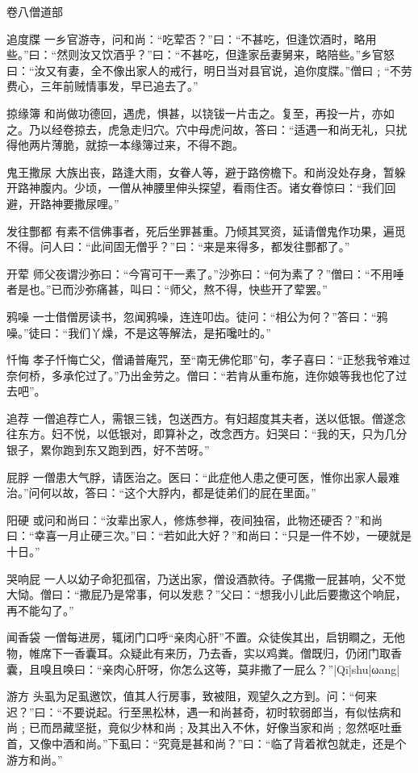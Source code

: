 \documentclass[12pt,UTF8]{ctexbook}
\begin{document}
卷八僧道部

追度牒
一乡官游寺，问和尚：“吃荤否？”曰：“不甚吃，但逢饮酒时，略用些。”曰：“然则汝又饮酒乎？”曰：“不甚吃，但逢家岳妻舅来，略陪些。”乡官怒曰：“汝又有妻，全不像出家人的戒行，明日当对县官说，追你度牒。”僧曰﹔“不劳费心，三年前贼情事发，早已追去了。”

掠缘簿
和尚做功德回，遇虎，惧甚，以铙钹一片击之。复至，再投一片，亦如之。乃以经卷掠去，虎急走归穴。穴中母虎问故，答曰：“适遇一和尚无礼，只扰得他两片薄脆，就掠一本缘簿过来，不得不跑。

鬼王撒尿
大族出丧，路逢大雨，女眷人等，避于路傍檐下。和尚没处存身，暂躲开路神腹内。少顷，一僧从神腰里伸头探望，看雨住否。诸女眷惊曰：“我们回避，开路神要撒尿哩。”

发往酆都
有素不信佛事者，死后坐罪甚重。乃倾其冥资，延请僧鬼作功果，遍觅不得。问人曰：“此间固无僧乎？”曰：“来是来得多，都发往酆都了。”

开荤
师父夜谓沙弥曰：“今宵可干一素了。”沙弥曰：“何为素了？”僧曰：“不用唾者是也。”已而沙弥痛甚，叫曰：“师父，熬不得，快些开了荤罢。”

鸦噪
一士借僧房读书，忽闻鸦噪，连连叩齿。徒问：“相公为何？”答曰：“鸦噪。”徒曰：“我们丫燥，不是这等解法，是拓嚵吐的。”

忏悔
孝子忏悔亡父，僧诵普庵咒，至“南无佛佗耶”句，孝子喜曰：“正愁我爷难过奈何桥，多承佗过了。”乃出金劳之。僧曰：“若肯从重布施，连你娘等我也佗了过去吧”。

追荐
一僧追荐亡人，需银三钱，包送西方。有妇超度其夫者，送以低银。僧遂念往东方。妇不悦，以低银对，即算补之，改念西方。妇哭曰：“我的天，只为几分银子，累你跑到东又跑到西，好不苦呀。”

屁脬
一僧患大气脬，请医治之。医曰：“此症他人患之便可医，惟你出家人最难治。”问何以故，答曰：“这个大脬内，都是徒弟们的屁在里面。”

阳硬
或问和尚曰：“汝辈出家人，修炼参禅，夜间独宿，此物还硬否？”和尚曰：“幸喜一月止硬三次。”曰：“若如此大好？”和尚曰：“只是一件不妙，一硬就是十日。”

哭响屁
一人以幼子命犯孤宿，乃送出家，僧设酒款待。子偶撒一屁甚响，父不觉大恸。僧曰：“撒屁乃是常事，何以发悲？”父曰：“想我小儿此后要撒这个响屁，再不能勾了。”

闻香袋
一僧每进房，辄闭门口呼“亲肉心肝”不置。众徒俟其出，启钥瞷之，无他物，帷席下一香囊耳。众疑此有来历，乃去香，实以鸡粪。僧既归，仍闭门取香囊，且嗅且唤曰：“亲肉心肝呀，你怎么这等，莫非撒了一屁么？”|Qī|shu|ωang|

游方
头虱为足虱邀饮，值其人行房事，致被阻，观望久之方到。问：“何来迟？”曰：“不要说起。行至黑松林，遇一和尚甚奇，初时软弱郎当，有似怯病和尚﹔已而昂藏坚挺，竟似少林和尚﹔及其出入不休，好像当家和尚﹔忽然呕吐垂首，又像中酒和尚。”下虱曰：“究竟是甚和尚？”曰：“临了背着袱包就走，还是个游方和尚。”
\end{document}
